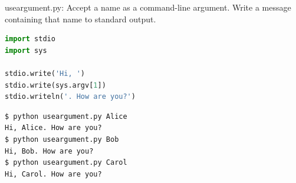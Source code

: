 \documentclass[8pt,a4paper,compress]{beamer}
\begin{document}
\begin{frame}[fragile]
\begin{framed}
\tiny useargument.py: Accept a name as a command-line argument. Write a message containing that name to standard output.
\end{framed}

\begin{lstlisting}[language=Python]
import stdio
import sys

stdio.write('Hi, ')
stdio.write(sys.argv[1])
stdio.writeln('. How are you?')
\end{lstlisting}

\begin{lstlisting}[language={}]
$ python useargument.py Alice
Hi, Alice. How are you?
$ python useargument.py Bob
Hi, Bob. How are you?
$ python useargument.py Carol
Hi, Carol. How are you?
\end{lstlisting}
\end{frame}
\end{document}
